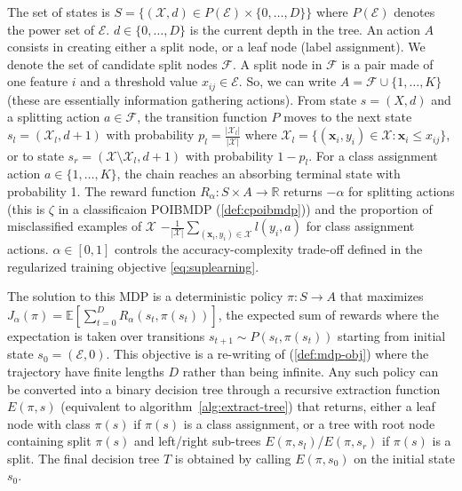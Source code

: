 The set of states is $S = \{ (\mathcal{X}, d) \in P(\mathcal{E}) \times \{0, \ldots, D\} \}$ where $P(\mathcal{E})$ denotes the power set of $\mathcal{E}$. $d \in \{0,\ldots,D\}$ is the current depth in the tree.
An action $A$ consists in creating either a split node, or a leaf node (label assignment). We denote the set of candidate split nodes $ {\mathcal F} $. A split node in $\mathcal F$ is a pair made of one feature $i$ and a threshold value $x_{ij}\in \mathcal{E}$.
So, we can write $A = {\mathcal{F} \cup \{ 1, \ldots, K \}}$ (these are essentially information gathering actions).
From state $s=(X,d)$ and a splitting action $a \in {\mathcal F}$, the transition function $P$ moves to the next state $s_l = (\mathcal{X}_l, d+1)$ with probability $p_l = \frac{|\mathcal{X}_l|}{|\mathcal{X}|}$ where $\mathcal{X}_l = \{(\boldsymbol{x}_i, y_i) \in \mathcal{X}: \boldsymbol{x}_i \leq x_{ij}\}$, or to state $s_r = (\mathcal{X} \setminus \mathcal{X}_l, d+1)$ with probability $1-p_l$. For a class assignment action $a \in \{1,\ldots,K\}$, the chain reaches an absorbing terminal state with probability 1. 
The reward function $R_{\alpha}: S \times A \rightarrow \mathbb{R}$ returns $-\alpha$ for splitting actions (this is $\zeta$ in a classificaion POIBMDP (\ref{def:cpoibmdp})) and the proportion of misclassified examples of $\mathcal{X}$ $-\frac{1}{|\mathcal{X}|}\sum_{(\boldsymbol{x}_i,y_i) \in \mathcal{X}} l(y_i, a)$ for class assignment actions. $\alpha \in [0,1]$ controls the accuracy-complexity trade-off defined in the regularized training objective \ref{eq:suplearning}. 

The solution to this MDP is a deterministic policy $\pi: S \rightarrow A$ that maximizes {$J_{\alpha}(\pi) ={\mathbb{E}}\left[\sum_{t = 0}^D R_{\alpha}(s_t, \pi(s_t))\right]$\label{def:finite-mdp-obj}}, the expected sum of rewards where the expectation is taken over transitions $s_{t+1}\sim P(s_t, \pi(s_t))$ starting from initial state $s_0 = (\mathcal{E}, 0)$.
This objective is a re-writing of (\ref{def:mdp-obj}) where the trajectory have finite lengths $D$ rather than being infinite.
Any such policy can be converted into a binary decision tree through a recursive extraction function $E(\pi, s)$ (equivalent to algorithm~\ref{alg:extract-tree}) that returns, either a leaf node with class $\pi(s)$ if $\pi(s)$ is a class assignment, or a tree with root node containing split $\pi(s)$ and left/right sub-trees $E(\pi, s_l)$/$E(\pi, s_r)$ if $\pi(s)$ is a split. The final decision tree $T$ is obtained by calling $E(\pi, s_0)$ on the initial state $s_0$. 

